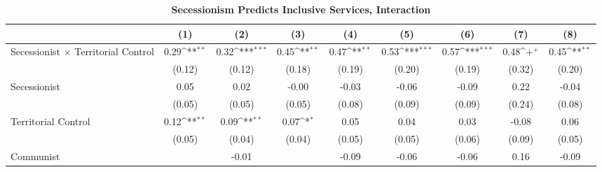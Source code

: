 \documentclass[12pt, letterpaper]{article}
\begin{document}
\begin{landscape}
\begin{table}[htbp]\centering
\begin{footnotesize}
\def\sym#1{\ifmmode^{#1}\else\(^{#1}\)\fi}
\makeatletter
\def\myrow{}
\CT@everycr{\noalign{%
\global\let\CT@row@color\relax
\stepcounter{mym2}%
\ifnum\value{mym2}=2
  \gdef\myrow{\rowcolor{gray!50}}
\else\ifnum\value{mym2}=8
  \gdef\myrow{}
\fi\fi
}\myrow}
\renewcommand\thetable{A.\Roman{table}}
\caption{\textbf{Secessionism Predicts Inclusive Services, Interaction}}
\label{table:mainint}
\begin{tabular}{l*{8}{c}}
\hline\hline
                    &\multicolumn{1}{c}{(1)}&\multicolumn{1}{c}{(2)}&\multicolumn{1}{c}{(3)}&\multicolumn{1}{c}{(4)}&\multicolumn{1}{c}{(5)}&\multicolumn{1}{c}{(6)}&\multicolumn{1}{c}{(7)}&\multicolumn{1}{c}{(8)}\\
\hline
Secessionist $\times$ Territorial Control&        0.29\sym{**} &        0.32\sym{***}&        0.45\sym{**} &        0.47\sym{**} &        0.53\sym{***}&        0.57\sym{***}&        0.48\sym{+}  &        0.45\sym{**} \\
                    &      (0.12)         &      (0.12)         &      (0.18)         &      (0.19)         &      (0.20)         &      (0.19)         &      (0.32)         &      (0.20)         \\
Secessionist      &        0.05         &        0.02         &       -0.00         &       -0.03         &       -0.06         &       -0.09         &        0.22         &       -0.04         \\
                    &      (0.05)         &      (0.05)         &      (0.05)         &      (0.08)         &      (0.09)         &      (0.09)         &      (0.24)         &      (0.08)         \\
Territorial Control&        0.12\sym{**} &        0.09\sym{**} &        0.07\sym{*}  &        0.05         &        0.04         &        0.03         &       -0.08         &        0.06         \\
                    &      (0.05)         &      (0.04)         &      (0.04)         &      (0.05)         &      (0.05)         &      (0.06)         &      (0.09)         &      (0.05)         \\
Communist           &                     &       -0.01         &                     &       -0.09         &       -0.06         &       -0.06         &        0.16         &       -0.09         \\

\end{tabular}
\end{footnotesize}
\end{table}
\end{landscape}
\end{document}
